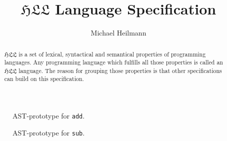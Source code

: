 \documentclass[11pt,a4paper,oneside]{article}
\author{Michael Heilmann}
\title{$\mathfrak{HLL}$ Language Specification}
\begin{document}
\maketitle
\begin{abstract}
$\mathfrak{HLL}$ is a set of lexical, syntactical and    semantical properties
of programming languages.            Any programming language which   fulfills
all those properties is called an $\mathfrak{HLL}$ language. The reason    for
grouping those properties is that other specifications can build       on this
specification.
\end{abstract}
\tableofcontents





\begin{figure}
\centering
{}
\caption{AST-prototype for \texttt{add}.}
\end{figure}

\begin{figure}
\centering
{}
\caption{AST-prototype for \texttt{sub}.}
\end{figure}

%
\printbibliography
\end{document}
